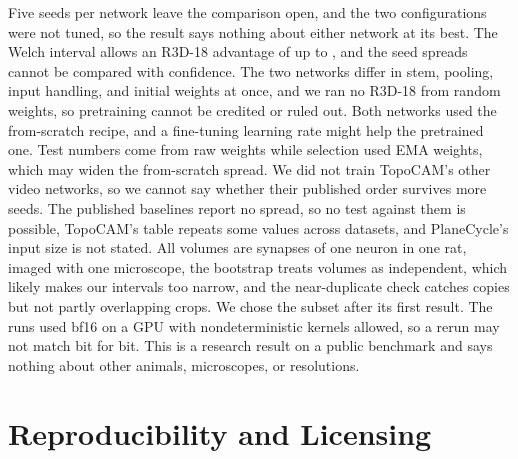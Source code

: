 \documentclass[conference]{IEEEtran}
\begin{document}
Five seeds per network leave the comparison open, and the two configurations were not tuned,
so the result says nothing about either network at its best. The Welch interval allows an R3D-18
advantage of up to \welchHi{}, and the seed spreads cannot be compared with confidence. The two networks differ in stem, pooling, input handling,
and initial weights at once, and we ran no R3D-18 from random weights, so pretraining cannot
be credited or ruled out. Both networks used the from-scratch recipe, and a fine-tuning
learning rate might help the pretrained one. Test numbers come from raw weights while
selection used EMA weights, which may widen the from-scratch spread. We did not train
TopoCAM's other video networks, so we cannot say whether their published order survives
more seeds. The published baselines report no spread, so no test against them is possible,
TopoCAM's table repeats some values across datasets, and PlaneCycle's input size is not
stated. All volumes are synapses of one neuron in one rat, imaged with one microscope, the bootstrap treats volumes as independent, which likely makes our intervals too narrow, and the
near-duplicate check catches copies but not partly overlapping crops. We chose the subset
after its first result. The runs used bf16 on a GPU with nondeterministic kernels allowed,
so a rerun may not match bit for bit. This is a research result on a public benchmark and
says nothing about other animals, microscopes, or resolutions.

\section{Reproducibility and Licensing}
\label{sec:repro}
\end{document}
